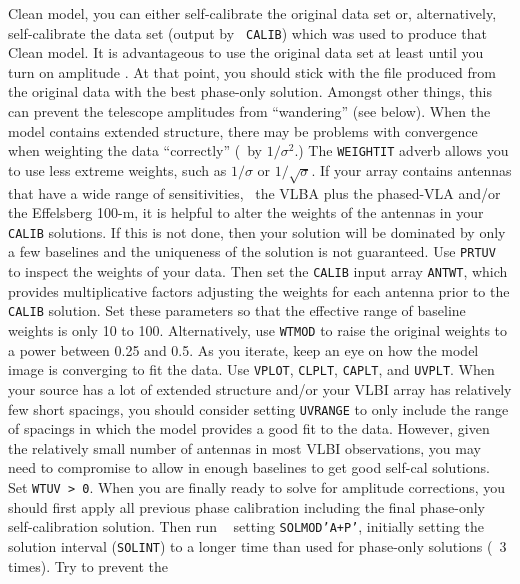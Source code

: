     Clean model, you can either self-calibrate the original data set
    or, alternatively, self-calibrate the data set (output by {\tt
    CALIB}) which was used to produce that Clean model.  It is
    advantageous to use the original data set at least until you  turn
    on amplitude .  At that point, you should stick
    with the file produced from the original data with the best
    phase-only solution.  Amongst other things, this can prevent the
    telescope amplitudes from ``wandering'' (see below).
\Item When the model contains extended structure, there may be
    problems with convergence when weighting the data ``correctly''
    (\ie\ by $1/\sigma^2$.)  The {\tt WEIGHTIT} adverb allows you to
    use less extreme weights, such as $1/\sigma$ or $1/\sqrt\sigma$.
    If your array contains antennas that have a wide range of
    sensitivities, \eg\ the VLBA plus the phased-VLA and/or the
    Effelsberg 100-m, it is helpful to alter the weights of the
    antennas in your {\tt CALIB} solutions.  If this is not done, then
    your solution will be dominated by only a few baselines and the
    uniqueness of the solution is not guaranteed.  Use {\tt PRTUV} to
    inspect the weights of your data.  Then set the {\tt CALIB} input
    array {\tt ANTWT}, which provides multiplicative factors adjusting
    the weights for each antenna prior to the {\tt CALIB} solution.
    Set these parameters so that the effective range of baseline
    weights is only 10 to 100.  Alternatively, use {\tt WTMOD} to raise
    the original weights to a power between 0.25 and 0.5.
\Item As you iterate, keep an eye on how the model image is converging
    to fit the data.  Use {\tt VPLOT}, {\tt CLPLT}, {\tt CAPLT}, and
    {\tt UVPLT}\@.
\Item When your source has a lot of extended structure and/or your
    VLBI array has relatively few short spacings, you should consider
    setting {\tt UVRANGE} to only include the range of spacings in
    which the model provides a good fit to the data.  However, given
    the relatively small number of antennas in most VLBI observations,
    you may need to compromise to allow in enough baselines to get
    good self-cal solutions.  Set {\tt WTUV > 0}.
\Item When you are finally ready to solve for amplitude corrections,
    you should first apply all previous phase calibration including
    the final phase-only self-calibration solution.  Then run {\tt
    } setting {\tt SOLMOD\qs 'A+P'}, initially setting
    the solution interval ({\tt SOLINT}) to a longer time than used
    for phase-only solutions (\eg\ 3 times).  Try to prevent the
